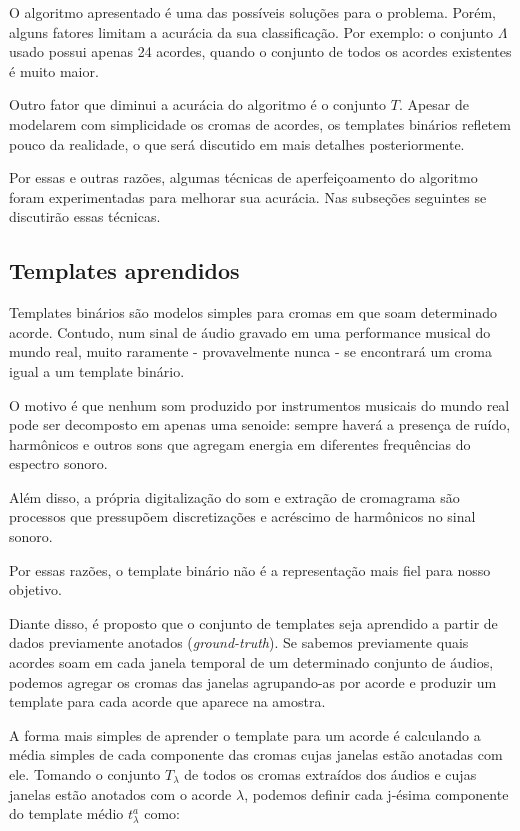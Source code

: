     O algoritmo apresentado é uma das possíveis soluções para o problema. Porém, alguns fatores limitam a acurácia da sua classificação. Por exemplo: o conjunto $\Lambda$ usado possui apenas 24 acordes, quando o conjunto de todos os acordes existentes é muito maior.

    Outro fator que diminui a acurácia do algoritmo é o conjunto $T$. Apesar de modelarem com simplicidade os cromas de acordes, os templates binários refletem pouco da realidade, o que será discutido em mais detalhes posteriormente.

    Por essas e outras razões, algumas técnicas de aperfeiçoamento do algoritmo foram experimentadas para melhorar sua acurácia. Nas subseções seguintes se discutirão essas técnicas.


    \subsection{Templates aprendidos}
        Templates binários são modelos simples para cromas em que soam determinado acorde. Contudo, num sinal de áudio gravado em uma performance musical do mundo real, muito raramente - provavelmente nunca - se encontrará um croma igual a um template binário.

        O motivo é que nenhum som produzido por instrumentos musicais do mundo real pode ser decomposto em apenas uma senoide: sempre haverá a presença de ruído, harmônicos e outros sons que agregam energia em diferentes frequências do espectro sonoro.

        Além disso, a própria digitalização do som e extração de cromagrama são processos que pressupõem discretizações e acréscimo de harmônicos no sinal sonoro.

        Por essas razões, o template binário não é a representação mais fiel para nosso objetivo.

        Diante disso, é proposto que o conjunto de templates seja aprendido a partir de dados previamente anotados (\textit{ground-truth}). Se sabemos previamente quais acordes soam em cada janela temporal de um determinado conjunto de áudios, podemos agregar os cromas das janelas agrupando-as por acorde e produzir um template para cada acorde que aparece na amostra.

        A forma mais simples de aprender o template para um acorde é calculando a média simples de cada componente das cromas cujas janelas estão anotadas com ele. Tomando o conjunto $T_\lambda$ de todos os cromas extraídos dos áudios e cujas janelas estão anotados com o acorde $\lambda$, podemos definir cada j-ésima componente do template médio $t_\lambda^a$ como:

